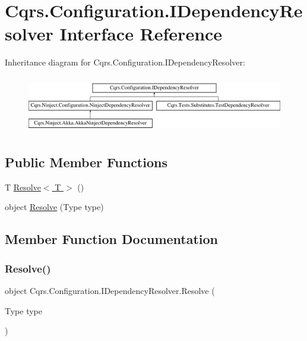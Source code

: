 \hypertarget{interfaceCqrs_1_1Configuration_1_1IDependencyResolver}{}\section{Cqrs.\+Configuration.\+I\+Dependency\+Resolver Interface Reference}
\label{interfaceCqrs_1_1Configuration_1_1IDependencyResolver}
Inheritance diagram for Cqrs.\+Configuration.\+I\+Dependency\+Resolver\+:\begin{figure}[H]
\begin{center}
\leavevmode
\includegraphics[height=2.514970cm]{interfaceCqrs_1_1Configuration_1_1IDependencyResolver}
\end{center}
\end{figure}
\subsection*{Public Member Functions}
\begin{DoxyCompactItemize}
\item 
T \hyperlink{interfaceCqrs_1_1Configuration_1_1IDependencyResolver_a9dc7694a365209a5ef05270a7cfa7b6b}{Resolve$<$ T $>$} ()
\item 
object \hyperlink{interfaceCqrs_1_1Configuration_1_1IDependencyResolver_aa455096b7b94fc1d64904bc67830ec06}{Resolve} (Type type)
\end{DoxyCompactItemize}


\subsection{Member Function Documentation}
\mbox{\label{interfaceCqrs_1_1Configuration_1_1IDependencyResolver_aa455096b7b94fc1d64904bc67830ec06}} 
\subsubsection{\texorpdfstring{Resolve()}{Resolve()}}
{\footnotesize\ttfamily object Cqrs.\+Configuration.\+I\+Dependency\+Resolver.\+Resolve (\begin{DoxyParamCaption}\item[{Type}]{type }\end{DoxyParamCaption})}



